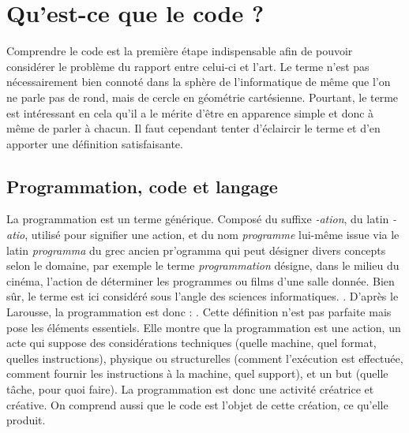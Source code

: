 \documentclass[12pt]{article} %
\begin{document}
\section{Qu'est-ce que le code ?}
Comprendre le code est la première étape indispensable afin de pouvoir considérer le problème du rapport entre celui-ci et l'art. Le terme n'est pas nécessairement bien connoté dans la sphère de l'informatique de même que l'on ne parle pas de rond, mais de cercle en géométrie cartésienne. Pourtant, le terme est intéressant en cela qu'il a le mérite d'être en apparence simple et donc à même de parler à chacun. Il faut cependant tenter d'éclaircir le terme et d'en apporter une définition satisfaisante.

\subsection{Programmation, code et langage}
La programmation est un terme générique. Composé du suffixe \textit{-ation}, du latin \textit{-atio}, utilisé pour signifier une action, et du nom \textit{programme} lui-même issue via le latin \textit{programma} du grec ancien \textgreek{pr'ogramma} qui peut désigner divers concepts selon le domaine, par exemple le terme \textit{programmation} désigne, dans le milieu du cinéma, l'action de déterminer les programmes ou films d'une salle donnée. Bien sûr, le terme est ici considéré sous l'angle des sciences informatiques.  \cite{Romero2017-mk}. D'après le Larousse, la programmation est donc : 
\cite{Nimmo2017-ya}. Cette définition n'est pas parfaite mais pose les éléments essentiels. Elle montre que la programmation est une action, un acte qui suppose des considérations techniques (quelle machine, quel format, quelles instructions), physique ou structurelles (comment l'exécution est effectuée, comment fournir les instructions à la machine, quel support), et un but (quelle tâche, pour quoi faire). La programmation est donc une activité créatrice et créative. On comprend aussi que le code est l'objet de cette création, ce qu'elle produit.
\end{document}
